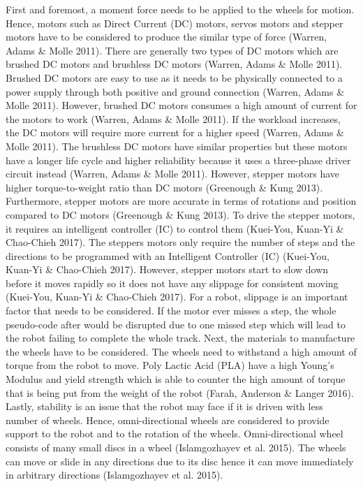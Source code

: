 \documentclass[12pt]{report}
\begin{document}
First and foremost, a moment force needs to be applied to the wheels for motion. Hence, motors such as Direct Current (DC) motors, servos motors and stepper motors have to be considered to produce the similar type of force (Warren, Adams \& Molle 2011). There are generally two types of DC motors which are brushed DC motors and brushless DC motors (Warren, Adams \& Molle 2011). Brushed DC motors are easy to use as it needs to be physically connected to a power supply through both positive and ground connection (Warren, Adams \& Molle 2011). However, brushed DC motors consumes a high amount of current for the motors to work (Warren, Adams \& Molle 2011). If the workload increases, the DC motors will require more current for a higher speed (Warren, Adams \& Molle 2011). The brushless DC motors have similar properties but these motors have a longer life cycle and higher reliability because it uses a three-phase driver circuit instead (Warren, Adams \& Molle 2011). However, stepper motors have higher torque-to-weight ratio than DC motors (Greenough \& Kung 2013). Furthermore, stepper motors are more accurate in terms of rotations and position compared to DC motors (Greenough \& Kung 2013). To drive the stepper motors, it requires an intelligent controller (IC) to control them (Kuei-You, Kuan-Yi \& Chao-Chieh 2017). The steppers motors only require the number of steps and the directions to be programmed with an Intelligent Controller (IC) (Kuei-You, Kuan-Yi \& Chao-Chieh 2017). However, stepper motors start to slow down before it moves rapidly so it does not have any slippage for consistent moving (Kuei-You, Kuan-Yi \& Chao-Chieh 2017). For a robot, slippage is an important factor that needs to be considered. If the motor ever misses a step, the whole pseudo-code after would be disrupted due to one missed step which will lead to the robot failing to complete the whole track. Next, the materials to manufacture the wheels have to be considered. The wheels need to withstand a high amount of torque from the robot to move. Poly Lactic Acid (PLA) have a high Young’s Modulus and yield strength which is able to counter the high amount of torque that is being put from the weight of the robot (Farah, Anderson \& Langer 2016). Lastly, stability is an issue that the robot may face if it is driven with less number of wheels. Hence, omni-directional wheels are considered to provide support to the robot and to the rotation of the wheels. Omni-directional wheel consists of many small discs in a wheel (Islamgozhayev et al. 2015). The wheels can move or slide in any directions due to its disc hence it can move immediately in arbitrary directions (Islamgozhayev et al. 2015).
\end{document}
